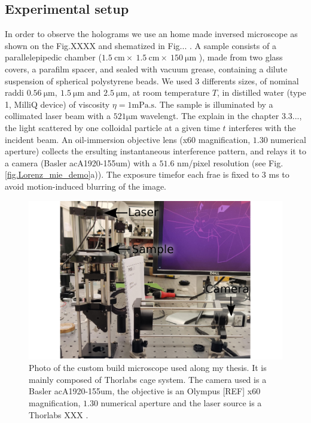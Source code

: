 \subsection{Experimental setup}

In order to observe the holograms we use an home made inversed microscope as shown on the Fig.XXXX and shematized in Fig... . A sample consists of a parallelepipedic chamber ($1.5 ~ \text{cm} \times ~ 1.5 ~ \text{cm} \times ~ 150 ~ \mathrm{\mu m} $ ), made from two glass covers, a parafilm spacer, and sealed with vacuum grease, containing a dilute suspension of spherical polystyrene beads. We used 3 differents sizes, of nominal raddi $0.56 ~ \mathrm{\mu m}, ~ 1.5 ~ \mathrm{\mu m} \text{ and } 2.5 ~ \mathrm{\mu m} $, at room temperature $T$, in distilled water (type 1, MilliQ device) of viscosity $\eta = 1 \mathrm{mPa.s}$. The sample is illuminated by a collimated laser beam with a $521 \mathrm{\mu m}$ wavelengt. The explain in the chapter 3.3..., the light scattered by one colloidal particle at a given time $t$ interferes with the incident beam. An oil-immersion objective lens (x60 magnification, $1.30$ numerical aperture) collects the ersulting instantaneous interference pattern, and relays it to a camera (Basler acA1920-155um) with a $51.6$ nm/pixel resolution (see Fig.\ref{fig.Lorenz_mie_demo}a)). The exposure timefor each frae is fixed to $3$ ms to avoid motion-induced blurring of the image.

\begin{figure}[h!]
	\centering
	\includegraphics{02_body/chapter2/images/figures_setup/photo_setup.pdf}
	\caption{Photo of the custom build microscope used along my thesis. It is mainly composed of Thorlabs cage system. The camera used is a Basler acA1920-155um, the objective is an Olympus [REF] x60 magnification, $1.30$ numerical aperture and the laser source is a Thorlabs XXX .}
\end{figure}

